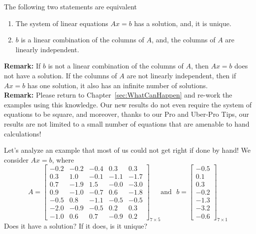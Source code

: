 \vspace*{.2cm}

\begin{tcolorbox}[sharp corners, colback=green!30, colframe=green!80!blue, title=\textbf{\large Existence and Uniqueness of Solutions to $Ax=b$}]
The following two statements are equivalent
\begin{enumerate}
\renewcommand{\labelenumi}{(\alph{enumi})}
\setlength{\itemsep}{.2cm}
\item The system of linear equations $Ax=b$ has a solution, and, it is unique.

\item $b$ is a linear combination of the columns of $A$, and, the columns of $A$ are linearly independent. 
\end{enumerate}

\textbf{Remark:} If $b$ is not a linear combination of the columns of $A$, then $Ax=b$ does not have a solution. If the columns of $A$ are not linearly independent, then if $Ax=b$ has one solution, it also has an infinite number of solutions. \\

\textbf{Remark:} Please return to Chapter~\ref{sec:WhatCanHappen} and re-work the examples using this knowledge. Our new results do not even require the system of equations to be square, and moreover, thanks to our Pro and Uber-Pro Tips, our results are not limited to a small number of equations that are amenable to hand calculations!
\end{tcolorbox}

\vspace*{.2cm}

\begin{example}
\label{eq:BigExampleRectangular}
Let's analyze an example that most of us could not get right if done by hand! We consider $Ax=b$, where
\begin{equation}
\label{eq:WowCanWeAnalyzeThis02}
A=\left[
\begin{array}{rrrrr}
-0.2 & -0.2 & -0.4 & 0.3 & 0.3 \\
0.3 & 1.0 & -0.1 & -1.1 & -1.7 \\
0.7 & -1.9 & 1.5 & -0.0 & -3.0 \\
0.9 & -1.0 & -0.7 & 0.6 & -1.8 \\
-0.5 & 0.8 & -1.1 & -0.5 & -0.5 \\
-2.0 & -0.9 & -0.5 & 0.2 & 0.3 \\
-1.0 & 0.6 & 0.7 & -0.9 & 0.2
\end{array}
\right]_{7 \times 5}\text{and}~~~b=\left[
\begin{array}{r}
-0.5 \\
0.1 \\
0.3 \\
-0.2 \\
-1.3 \\
-3.2 \\
-0.6
\end{array}
\right]_{7 \times 1}
\end{equation}
Does it have a solution? If it does, is it unique? 
\end{example}


